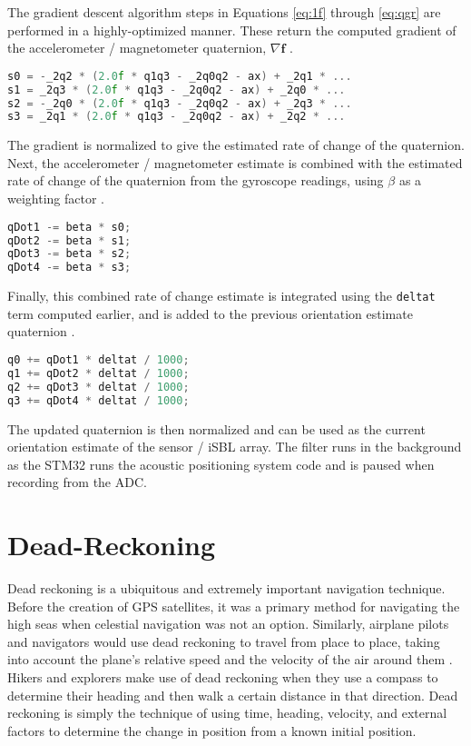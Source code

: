 \documentclass[12pt,a4paper]{report}
\begin{document}
The gradient descent algorithm steps in Equations \ref{eq:1f} through \ref{eq:qgr} are performed in a highly-optimized manner. These return the computed gradient of the accelerometer / magnetometer quaternion, \(\nabla \mathbf{f}\) \cite{xiotech}.

\begin{lstlisting}[language=C++]
s0 = -_2q2 * (2.0f * q1q3 - _2q0q2 - ax) + _2q1 * ...
s1 = _2q3 * (2.0f * q1q3 - _2q0q2 - ax) + _2q0 * ...	
s2 = -_2q0 * (2.0f * q1q3 - _2q0q2 - ax) + _2q3 * ...
s3 = _2q1 * (2.0f * q1q3 - _2q0q2 - ax) + _2q2 * ...
\end{lstlisting}

The gradient is normalized to give the estimated rate of change of the quaternion. Next, the accelerometer / magnetometer estimate is combined with the estimated rate of change of the quaternion from the gyroscope readings, using \(\beta\) as a weighting factor \cite{xiotech}.

\begin{lstlisting}[language=C++]
qDot1 -= beta * s0;
qDot2 -= beta * s1;
qDot3 -= beta * s2;
qDot4 -= beta * s3;
\end{lstlisting}

Finally, this combined rate of change estimate is integrated using the \verb|deltat| term computed earlier, and is added to the previous orientation estimate quaternion \cite{xiotech}.

\begin{lstlisting}[language=C++]
q0 += qDot1 * deltat / 1000;
q1 += qDot2 * deltat / 1000;
q2 += qDot3 * deltat / 1000;
q3 += qDot4 * deltat / 1000;
\end{lstlisting}

The updated quaternion is then normalized and can be used as the current orientation estimate of the sensor / iSBL array. The filter runs in the background as the STM32 runs the acoustic positioning system code and is paused when recording from the ADC.

\section{Dead-Reckoning} \label{sec:4s5}
Dead reckoning is a ubiquitous and extremely important navigation technique. Before the creation of GPS satellites, it was a primary method for navigating the high seas when celestial navigation was not an option. Similarly, airplane pilots and navigators would use dead reckoning to travel from place to place, taking into account the plane’s relative speed and the velocity of the air around them \cite{britdeadreck}. Hikers and explorers make use of dead reckoning when they use a compass to determine their heading and then walk a certain distance in that direction. Dead reckoning is simply the technique of using time, heading, velocity, and external factors to determine the change in position from a known initial position.
\end{document}
